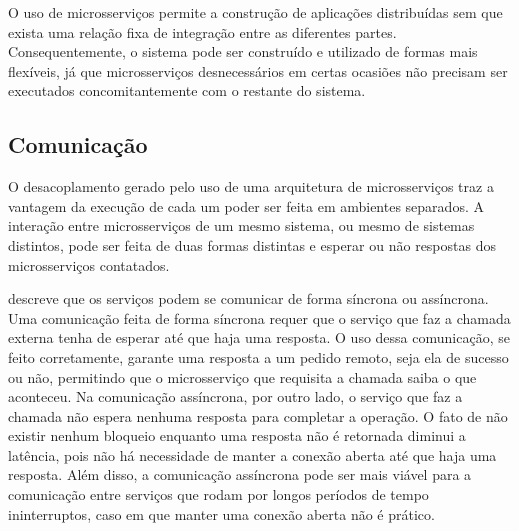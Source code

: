 O uso de microsserviços permite a construção de aplicações distribuídas sem que exista uma relação fixa de integração entre as diferentes partes. Consequentemente, o sistema pode ser construído e utilizado de formas mais flexíveis, já que microsserviços desnecessários em certas ocasiões não precisam ser executados concomitantemente com o restante do sistema. 

\subsection{Comunicação}
\label{sec:servicecom}

O desacoplamento gerado pelo uso de uma arquitetura de microsserviços traz a vantagem da execução de cada um poder ser feita em ambientes separados. A interação entre microsserviços de um mesmo sistema, ou mesmo de sistemas distintos, pode ser feita de duas formas distintas e esperar ou não respostas dos microsserviços contatados. 



\cite{Newman:2015:BM:2904388} descreve que os serviços podem se comunicar de forma síncrona ou assíncrona. Uma comunicação feita de forma síncrona requer que o serviço que faz a chamada externa tenha de esperar até que haja uma resposta. O uso dessa comunicação, se feito corretamente, garante uma resposta a um pedido remoto, seja ela de sucesso ou não, permitindo que o microsserviço que requisita a chamada saiba o que aconteceu. Na comunicação assíncrona, por outro lado, o serviço que faz a chamada não espera nenhuma resposta para completar a operação. O fato de não existir nenhum bloqueio enquanto uma resposta não é retornada diminui a latência, pois não há necessidade de manter a conexão aberta até que haja uma resposta. Além disso, a comunicação assíncrona pode ser mais viável para a comunicação entre serviços que rodam por longos períodos de tempo ininterruptos, caso em que manter uma conexão aberta não é prático. 

